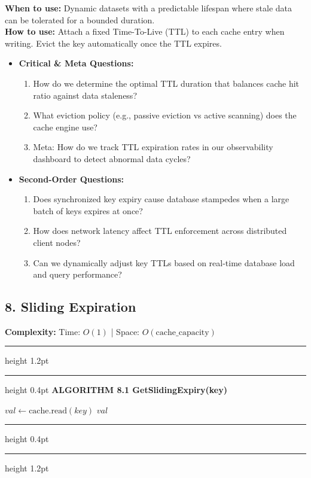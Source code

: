 \documentclass[11pt,a4paper]{article}
\newenvironment{textbookalgo}[2]{%
  \par\addvspace{1.2em}\noindent
  \hrule height 1.2pt
  \vspace{1.5pt}
  \hrule height 0.4pt
  \vspace{5pt}
  {\noindent\large\bfseries\sffamily ALGORITHM #1 \quad #2}
  \par\vspace{5pt}
  \RestyleAlgo{plain}
}{%
  \par\vspace{4pt}
  \hrule height 0.4pt
  \vspace{1.5pt}
  \hrule height 1.2pt
  \par\addvspace{1.2em}
}
\theoremstyle{definition}
\begin{document}
\noindent
\textbf{When to use:} Dynamic datasets with a predictable lifespan where stale data can be tolerated for a bounded duration.\\
\textbf{How to use:} Attach a fixed Time-To-Live (TTL) to each cache entry when writing. Evict the key automatically once the TTL expires.
\begin{itemize}[leftmargin=*]
  \item[] \textbf{Critical \& Meta Questions:}
  \begin{enumerate}
  \item How do we determine the optimal TTL duration that balances cache hit ratio against data staleness?
  \item What eviction policy (e.g., passive eviction vs active scanning) does the cache engine use?
  \item Meta: How do we track TTL expiration rates in our observability dashboard to detect abnormal data cycles?
  \end{enumerate}
  \item[] \textbf{Second-Order Questions:}
  \begin{enumerate}
  \item Does synchronized key expiry cause database stampedes when a large batch of keys expires at once?
  \item How does network latency affect TTL enforcement across distributed client nodes?
  \item Can we dynamically adjust key TTLs based on real-time database load and query performance?
  \end{enumerate}
\end{itemize}
\medskip

\clearpage
\subsection{8. Sliding Expiration}

\noindent
\textbf{Complexity:} Time: $O(1)$ | Space: $O(\text{cache\_capacity})$
\smallskip

\begin{textbookalgo}{8.1}{GetSlidingExpiry(key)}
\begin{algorithm}[H]
$val \leftarrow \text{cache.read}(key)$\;
\Return $val$\;
\end{algorithm}
\end{textbookalgo}
\end{document}
